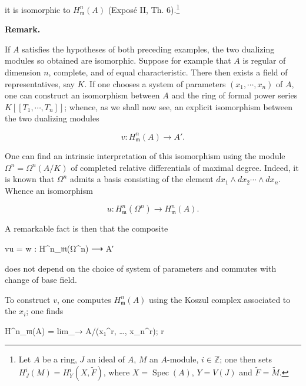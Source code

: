 \documentclass[
  11pt,
  a4paper,
]{book}
\newenvironment{Shaded}{}{}
\newcommand{\NormalTok}[1]{#1}
\begin{document}
it is isomorphic to \(H^{n}_{\mathfrak{m}}(A)\) (Exposé II, Th.
6).\footnote{Let \(A\) be a ring, \(J\) an ideal of \(A\), \(M\) an
  \(A\)-module, \(i \in \mathbb{Z}\); one then sets \(H^{i}_{J}(M) =
  H^{i}_{Y}(X, \tilde{F})\), where \(X = \operatorname{Spec}(A)\),
  \(Y = V(J)\) and \(\tilde{F} = \tilde{M}\).}

\textbf{Remark.}

If \(A\) satisfies the hypotheses of both preceding examples, the two
dualizing modules so obtained are isomorphic. Suppose for example that
\(A\) is regular of dimension \(n\), complete, and of equal
characteristic. There then exists a field of representatives, say \(K\).
If one chooses a system of parameters \((x_{1}, \cdots, x_{n})\) of
\(A\), one can construct an isomorphism between \(A\) and the ring of
formal power series \(K[[T_{1}, \cdots, T_{n}]]\); whence, as we shall
now see, an explicit isomorphism between the two dualizing modules

\[ v : H^{n}_{\mathfrak{m}}(A) \longrightarrow A'. \]

One can find an intrinsic interpretation of this isomorphism using the
module \(\Omega^{n} = \Omega^{n}(A/K)\) of completed relative
differentials of maximal degree. Indeed, it is known that \(\Omega^{n}\)
admits a basis consisting of the element
\(dx_{1} \wedge dx_{2} \cdots \wedge dx_{n}\). Whence an isomorphism

\[ u : H^{n}_{\mathfrak{m}}(\Omega^{n}) \longrightarrow H^{n}_{\mathfrak{m}}(A). \]

A remarkable fact is then that the composite

\begin{Shaded}
\begin{Highlighting}[]
\NormalTok{vu = w : H\^{}n\_𝔪(Ω\^{}n) ⟶ A′}
\end{Highlighting}
\end{Shaded}

does not depend on the choice of system of parameters and commutes with
change of base field.

To construct \(v\), one computes \(H^{n}_{\mathfrak{m}}(A)\) using the
Koszul complex associated to the \(x_{i}\); one finds

\begin{Shaded}
\begin{Highlighting}[]
\NormalTok{H\^{}n\_𝔪(A) = lim\_→ A/(x₁\^{}r, …, x\_n\^{}r);}
\NormalTok{            r}
\end{Highlighting}
\end{Shaded}
\end{document}
